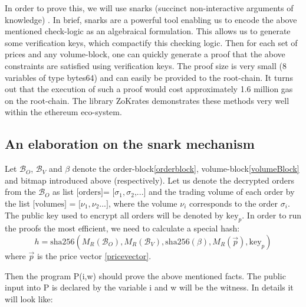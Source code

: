 \documentclass[11pt,parskip=full]{scrartcl}%
\begin{document}
In order to prove this, we will use snarks (succinct non-interactive arguments of knowledge) \cite{snarks}. 
In brief, snarks are a powerful tool enabling us to encode the above mentioned check-logic as an algebraical formulation. 
This allows us to generate some verification keys, which compactify this checking logic. 
Then for each set of prices and any volume-block, one can quickly generate a proof that the above constraints are satisfied using verification keys. 
The proof size is very small (8 variables of type bytes64) and can easily be provided to the root-chain. 
It turns out that the execution of such a proof would cost approximately 1.6 million gas on the root-chain. 
The library ZoKrates \cite{zokrates} demonstrates these methods very well within the ethereum eco-system. 

\subsection*{An elaboration on the snark mechanism}

Let $\mathcal{B}_O$, $\mathcal{B}_V$ and $\beta$ denote the order-block\ref{orderblock}, volume-block\ref{volumeBlock} and bitmap introduced above (respectively). 
Let us denote the decrypted orders from the $\mathcal{B}_O$ as list $\text{[orders]= [}\sigma_1, \sigma_2\text{,...]}$ and the trading volume of each order by the list $\text{[volumes] = [}\nu_1, \nu_2\text{...]}$, where the volume $\nu_i$ corresponds to the order $\sigma_i$. 
The public key used to encrypt all orders will be denoted by $\text{key}_p$.
In order to run the proofs the most efficient, we need to calculate a special hash:
\begin{equation}
h = \text{sha256}(M_R(\mathcal{B}_O),M_R(\mathcal{B}_V), \text{sha256}(\beta), M_R(\vec{p}), \text{key}_p) 
\end{equation}
where $\vec{p}$ is the price vector \ref{pricevector}.

Then the program P(i,w) should prove the above mentioned facts. 
The public input into P is declared by the variable i and w will be the witness. 
In details it will look like:
\end{document}
